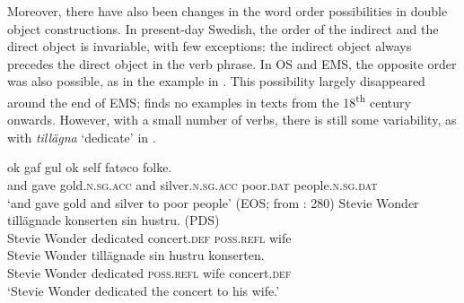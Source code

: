 \documentclass[output=paper]{langscibook}
\begin{document}
\ea\label{ex:intro:24}

\z
\ex \label{ex:intro:25}

\z
\z

Moreover, there have also been changes in the word order possibilities in double object constructions. In present-day Swedish, the order of the indirect and the direct object is invariable, with few exceptions: the indirect object always precedes the direct object in the verb phrase. In OS and EMS, the opposite order was also possible, as in the example in . This possibility largely disappeared around the end of EMS; \citet{Valdeson2016} finds no examples in texts from the 18\textsuperscript{th} century onwards. However, with a small number of verbs, there is still some variability, as with \textit{tillägna} ‘dedicate’ in .


\ea\label{ex:intro:26}
\gll  ok   gaf   gul             ok   self           fatøco     folke. \\
  and gave   gold\textsc{.n.sg.acc}   and  silver\textsc{.n.sg.acc}   poor\textsc{.dat}   people\textsc{.n.sg.dat}\\
    \glt `and gave gold and silver to poor people’ (EOS; from \citealt{Valdeson2016}: 280)
\ex\label{ex:intro:27}
\ea
\gll  Stevie Wonder   tillägnade konserten     sin         hustru. (PDS)\\
Stevie Wonder  dedicated  concert.\textsc{def}     \textsc{poss.refl}  wife  \\

\ex
\gll  Stevie Wonder   tillägnade   sin       hustru   konserten.\\
        Stevie Wonder  dedicated  \textsc{poss.refl}  wife     concert\textsc{.def}  \\
\glt        ‘Stevie Wonder dedicated the concert to his wife.’ \citep[137]{Lundquist2014Double}
\z
\z
\end{document}

